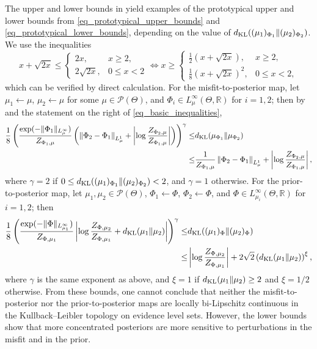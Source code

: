 \documentclass[a4paper]{scrartcl}
\theoremstyle{definition}
\numberwithin{equation}{section}
\newcommand{\R}{\mathbb{R}}
\newcommand{\Abs}[1]{\left\vert#1\right\vert}
\newcommand{\norm}[1]{\Vert #1 \Vert}
\newcommand{\Norm}[1]{\left\Vert #1 \right\Vert}
\newcommand{\KL}[0]{\textup{KL}}
\begin{document}
The upper and lower bounds in  yield examples of the prototypical upper and lower bounds from \eqref{eq_prototypical_upper_bounds} and \eqref{eq_prototypical_lower_bounds}, depending on the value of $d_{\KL}((\mu_1)_{\Phi_1}\Vert (\mu_2)_{\Phi_2})$.
We use the inequalities
\begin{equation}
\label{eq_basic_inequalities}
 x+\sqrt{2x}\leq \begin{cases}
                  2x, & x\geq 2,
                  \\
                  2\sqrt{2x}, & 0\leq x<2
                 \end{cases}
                 \Longleftrightarrow x\geq \begin{cases}
                                            \tfrac{1}{2}(x+\sqrt{2x}), & x\geq 2,
                                            \\
                                            \tfrac{1}{8}(x+\sqrt{2x})^2, & 0\leq x<2,
                                           \end{cases}
\end{equation}
which can be verified by direct calculation.
For the misfit-to-posterior map, let $\mu_1\leftarrow\mu$, $\mu_2\leftarrow\mu$ for some $\mu\in\mathcal{P}(\Theta)$, and $\Phi_i\in L^\infty_\mu(\Theta,\R)$ for $i=1,2$; then by  and the statement on the right of \eqref{eq_basic_inequalities},
\begin{align*}
\frac{1}{8}\left(\frac{\exp(-\norm{\Phi_1}_{L^\infty_{\mu}})}{Z_{\Phi_1,\mu}} \left(\Norm{ \Phi_2-\Phi_1}_{L^1_{\mu}}+\Abs{\log\frac{ Z_{\Phi_2,\mu}}{Z_{\Phi_1,\mu}}}\right)\right)^{\gamma}\leq& d_{\KL}(\mu_{\Phi_1}\Vert \mu_{\Phi_2})
\\
\leq & \frac{1}{Z_{\Phi_1,\mu}} \Norm{\Phi_2-\Phi_1}_{L^1_{\mu}} + \Abs{\log \frac{Z_{\Phi_2,\mu}}{Z_{\Phi_1,\mu}}} ,
\end{align*}
where $\gamma=2$ if $0\leq d_{\KL}((\mu_1)_{\Phi_1}\Vert (\mu_2)_{\Phi_2})<2$, and $\gamma=1$ otherwise.
For the prior-to-posterior map, let $\mu_1,\mu_2\in\mathcal{P}(\Theta)$, $\Phi_1\leftarrow\Phi$, $\Phi_2\leftarrow \Phi$, and $\Phi\in L^\infty_{\mu_i}(\Theta,\R)$ for $i=1,2$; then 
\begin{align*}
\frac{1}{8}\left(\frac{\exp(-\norm{\Phi}_{L^\infty_{\mu_1}})}{Z_{\Phi,\mu_1}} \Abs{\log\frac{ Z_{\Phi,\mu_2}}{Z_{\Phi,\mu_1}}+d_{\KL}(\mu_1\Vert \mu_2)}\right)^{\gamma}\leq& d_{\KL}((\mu_1)_{\Phi}\Vert (\mu_2)_{\Phi})
\\
\leq & \Abs{\log \frac{Z_{\Phi,\mu_2}}{Z_{\Phi,\mu_1}}} + 2\sqrt{2} \left(d_{\KL}(\mu_1\Vert \mu_2)\right)^\xi,
\end{align*}
where $\gamma$ is the same exponent as above, and $\xi=1$ if $d_{\KL}(\mu_1\Vert \mu_2)\geq 2$ and $\xi=1/2$ otherwise.
From these bounds, one cannot conclude that neither the misfit-to-posterior nor the prior-to-posterior maps are locally bi-Lipschitz continuous in the Kullback--Leibler topology on evidence level sets.
However, the lower bounds show that more concentrated posteriors are more sensitive to perturbations in the misfit and in the prior.
\end{document}
